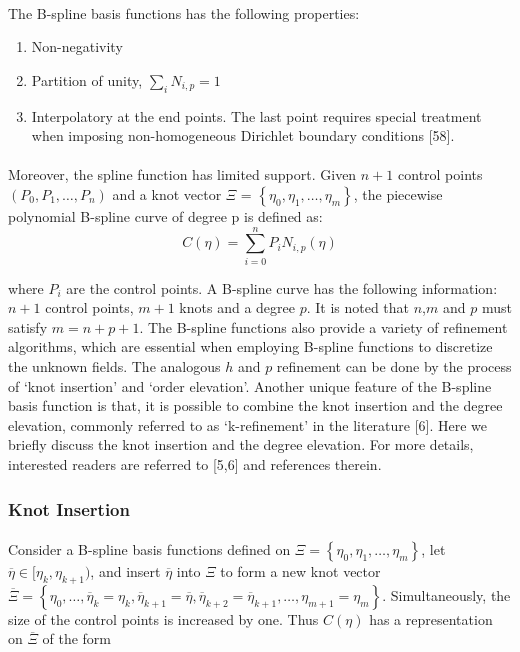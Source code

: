 \paragraph{}
The B-spline basis functions has the following properties:
\begin{enumerate}
    \item Non-negativity
    \item Partition of unity, $\sum_i N_{i,p}=1$
    \item Interpolatory at the end points. The last point requires special treatment when imposing non-homogeneous Dirichlet boundary conditions [58].
\end{enumerate}


\paragraph{}
Moreover, the spline function has limited support.
Given $n + 1$ control points $(P_0 ,P_1,\dots,P_n )$ and a knot vector 
    $\Xi$ = $\left\{
        \eta_0 ,\eta_1 ,\dots,\eta_m 
    \right\}$, the piecewise polynomial B-spline curve of degree p is defined as:
\begin{equation}
    C(\eta) = \sum_{i=0}^n P_i N_{i,p} (\eta)
\end{equation}

where $P_i$ are the control points.
A B-spline curve has the following information: $n+1$ control points, $m+1$ knots and a degree $p$.
It is noted that $n$,$m$ and $p$ must satisfy $m = n + p + 1$.
The B-spline functions also provide a variety of refinement algorithms, which are essential when employing B-spline functions to discretize the unknown fields.
The analogous $h$ and $p$ refinement can be done by the process of `knot insertion' and `order elevation'.
Another unique feature of the B-spline basis function is that, it is possible to combine the knot insertion and the degree elevation, commonly referred to as ‘k-refinement’ in the literature [6].
Here we briefly discuss the knot insertion and the degree elevation.
For more details, interested readers are referred to [5,6] and references therein.


\subsubsection{Knot Insertion}
\paragraph{}
Consider a B-spline basis functions defined on $\Xi = \left\{
    \eta_0 ,\eta_1,\dots,\eta_m 
    \right\}$, let $\overline{\eta} \in [\eta_k ,\eta_{k+1} )$, and insert $\overline{\eta}$ into $\Xi$ to form a new knot vector $\overline{\Xi} = \left\{
    \eta_0 ,\dots, \overline{\eta}_k = \eta_k , 
    \overline{\eta}_{k+1} = \overline{\eta}, 
    \overline{\eta}_{k+2} = \overline{\eta}_{k+1} ,
    \dots,\eta_{m+1} = \eta_m
    \right\}$. Simultaneously, the size of the control points is increased by one. Thus $C(\eta)$ has a representation on $\overline{\Xi}$ of the form